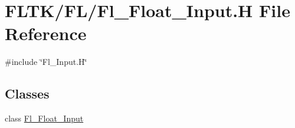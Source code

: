 \hypertarget{_fl___float___input_8_h}{}\section{F\+L\+T\+K/\+F\+L/\+Fl\+\_\+\+Float\+\_\+\+Input.H File Reference}
\label{_fl___float___input_8_h}
{\ttfamily \#include \char`\"{}Fl\+\_\+\+Input.\+H\char`\"{}}\newline
\subsection*{Classes}
\begin{DoxyCompactItemize}
\item 
class \hyperlink{class_fl___float___input}{Fl\+\_\+\+Float\+\_\+\+Input}
\end{DoxyCompactItemize}
